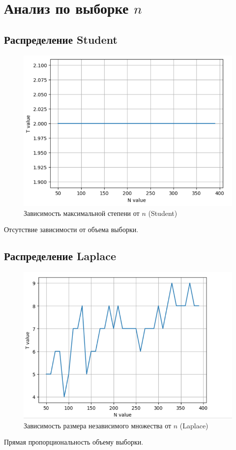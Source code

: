 \documentclass{HSEtitle}
\begin{document}
\section{Анализ по выборке $n$}

\subsection{Распределение Student}
\begin{figure}[H]
    \centering
    \includegraphics[width=0.7\linewidth]{6.png}
    \caption{Зависимость максимальной степени от $n$ (Student)}
    \label{fig:student_n}
\end{figure}
Отсутствие зависимости от объема выборки.

\subsection{Распределение Laplace}
\begin{figure}[H]
    \centering
    \includegraphics[width=0.7\linewidth]{8.png}
    \caption{Зависимость размера независимого множества от $n$ (Laplace)}
    \label{fig:laplace_n}
\end{figure}
Прямая пропорциональность объему выборки.
\end{document}
